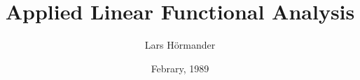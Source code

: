 %

\pagestyle{plain}
\setlength\beforechapskip{-\baselineskip}
\setlength\midchapskip{1em}
\setlength\afterchapskip{\midchapskip}
\title{Applied Linear Functional Analysis}
\author{Lars H\"ormander}
\date{Febrary, 1989}
\frontmatter

\mainmatter




